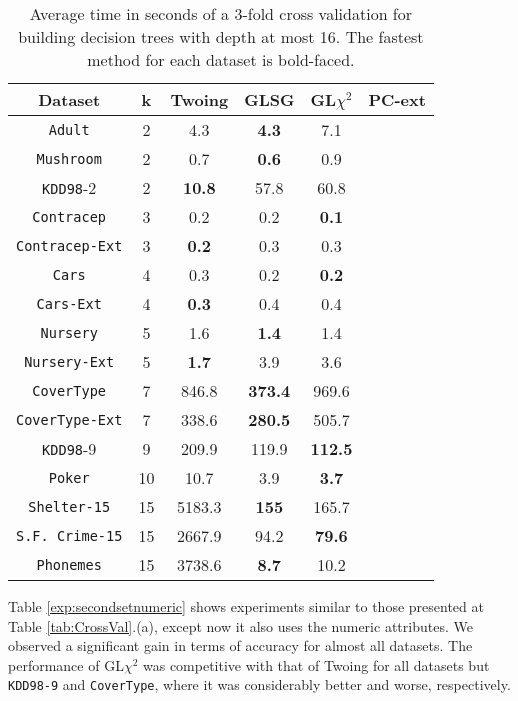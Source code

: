 \begin{table}[]
\small
\caption{Average time in seconds of a 3-fold cross validation
for building decision trees with depth at most 16.
The fastest method for each dataset is bold-faced.}
\centering
\begin{tabular}{c|c|c|c|c|c}
Dataset             & k  & Twoing        & GLSG      & GL$\chi^2$  & PC-ext \\ \hline
{\tt Adult}         & 2  & 4.3           & {\bf 4.3} & 7.1         &    \\
{\tt Mushroom}      & 2  & 0.7           & {\bf 0.6} & 0.9         & \\
{\tt KDD98}-2       & 2  & {\bf 10.8}    & 57.8      & 60.8        & \\
{\tt Contracep}     & 3  & 0.2           & 0.2       & {\bf 0.1}   & \\
{\tt Contracep-Ext} & 3  & {\bf 0.2}     & 0.3       & 0.3         & \\
{\tt Cars}          & 4  & 0.3           & 0.2       & {\bf 0.2}   & \\
{\tt Cars-Ext}      & 4  & {\bf 0.3}     & 0.4       & 0.4         & \\
{\tt Nursery}       & 5  & 1.6           &  {\bf 1.4}      &  1.4  &      \\
{\tt Nursery-Ext}   & 5  & {\bf 1.7}           &  3.9 & 3.6        &  \\
{\tt CoverType}     & 7  & 846.8         &{\bf 373.4}& 969.6       & \\
{\tt CoverType-Ext} & 7  & 338.6         &{\bf 280.5}& 505.7       & \\
{\tt KDD98}-9       & 9  & 209.9         & 119.9     & {\bf 112.5} & \\
{\tt Poker}         & 10 & 10.7          & 3.9       & {\bf 3.7}   & \\ 
{\tt Shelter-15}    & 15 & 5183.3        &{\bf 155}  & 165.7       & \\   
{\tt S.F. Crime-15} & 15 & 2667.9        & 94.2      &{\bf 79.6}   & \\ 
{\tt Phonemes}      & 15 & 3738.6        &{\bf 8.7}  & 10.2        & 
\end{tabular}
\label{tab:time}
\end{table}


Table \ref{exp:secondsetnumeric}
shows experiments  similar to those presented at Table \ref{tab:CrossVal}.(a), except now it also uses the numeric attributes.
We observed a significant gain in terms of accuracy for almost all datasets. 
The performance of GL$\chi^2$ was competitive with that of Twoing for all datasets but {\tt KDD98-9} and {\tt CoverType}, where it was
considerably better and worse, respectively.


